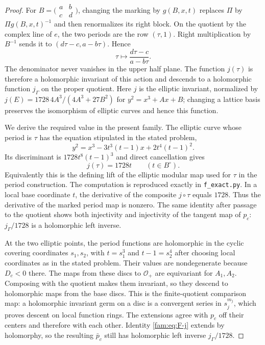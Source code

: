 \begin{proof}
For $B=\bigl(\begin{smallmatrix}a&b\\c&d\end{smallmatrix}\bigr)$, changing
the marking by $g(B,x,t)$ replaces $\Pi$ by $\Pi g(B,x,t)^{-1}$ and then
renormalizes its right block.  On the quotient by the complex line of
$e$, the two periods are the row $(\tau,1)$.  Right multiplication by
$B^{-1}$ sends it to $(d\tau-c,a-b\tau)$.  Hence
\begin{equation}\label{fam:eq:F-tauaction}
 \tau\longmapsto\frac{d\tau-c}{a-b\tau}.
\end{equation}
The denominator never vanishes in the upper half plane.  The function
$j(\tau)$ is therefore a holomorphic invariant of this action and
descends to a holomorphic function $j_\Gamma$ on the proper quotient.
Here $j$ is the elliptic invariant, normalized by
$j(E)=1728\,4A^3/(4A^3+27B^2)$ for $y^2=x^3+Ax+B$; changing a lattice
basis preserves the isomorphism of elliptic curves and hence this
function.

We derive the required value in the present family.  The elliptic curve
whose period is $\tau$ has the equation stipulated in the stated problem,
\[
 y^2=x^3-3t^3(t-1)x+2t^4(t-1)^2.
\]
Its discriminant is $1728t^8(t-1)^3$ and direct cancellation gives
\begin{equation}\label{fam:eq:F-j}
 j(\tau)=1728t\qquad(t\in B^\circ).
\end{equation}
Equivalently this is the defining lift of the elliptic modular map used
for $\tau$ in the period construction.  The computation is reproduced
exactly in \texttt{f\_exact.py}.  In a local base coordinate $t$, the
derivative of the composite $j\circ\tau$ equals $1728$.  Thus the
derivative of the marked period map is nonzero.  The same identity after
passage to the quotient shows both injectivity and injectivity of the
tangent map of $p_c$: $j_\Gamma/1728$ is a holomorphic left inverse.

At the two elliptic points, the period functions are holomorphic in the
cyclic covering coordinates $s_1,s_2$, with $t=s_1^3$ and
$t-1=s_2^4$ after choosing local coordinates as in the stated problem.  Their
values are nondegenerate because $D_c<0$ there.  The maps from these
discs to $\mathcal O_+$ are equivariant for $A_1,A_2$.  Composing with
the quotient makes them invariant, so they descend to holomorphic maps
from the base discs.  This is the finite-quotient comparison map: a
holomorphic invariant germ on a disc is a convergent series in $s_j^{m_j}$,
which proves descent on local function rings.  The extensions agree
with $p_c$ off their centers and therefore with each other.  Identity
\eqref{fam:eq:F-j} extends by holomorphy, so the resulting $\bar p_c$ still
has holomorphic left inverse $j_\Gamma/1728$.


\end{proof}
